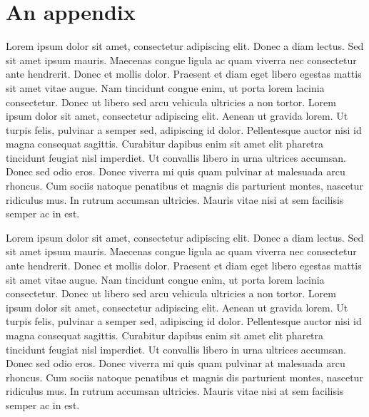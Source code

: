 \chapter{An appendix}
\label{ch:intro}

Lorem ipsum dolor sit amet, consectetur adipiscing elit. Donec a diam lectus.
Sed sit amet ipsum mauris. Maecenas congue ligula ac quam viverra nec
consectetur ante hendrerit. Donec et mollis dolor. Praesent et diam eget libero
egestas mattis sit amet vitae augue. Nam tincidunt congue enim, ut porta lorem
lacinia consectetur. Donec ut libero sed arcu vehicula ultricies a non tortor.
Lorem ipsum dolor sit amet, consectetur adipiscing elit. Aenean ut gravida
lorem. Ut turpis felis, pulvinar a semper sed, adipiscing id dolor. Pellentesque
auctor nisi id magna consequat sagittis. Curabitur dapibus enim sit amet elit
pharetra tincidunt feugiat nisl imperdiet. Ut convallis libero in urna ultrices
accumsan. Donec sed odio eros. Donec viverra mi quis quam pulvinar at malesuada
arcu rhoncus. Cum sociis natoque penatibus et magnis dis parturient montes,
nascetur ridiculus mus. In rutrum accumsan ultricies. Mauris vitae nisi at sem
facilisis semper ac in est.

Lorem ipsum dolor sit amet, consectetur adipiscing elit. Donec a diam lectus.
Sed sit amet ipsum mauris. Maecenas congue ligula ac quam viverra nec
consectetur ante hendrerit. Donec et mollis dolor. Praesent et diam eget libero
egestas mattis sit amet vitae augue. Nam tincidunt congue enim, ut porta lorem
lacinia consectetur. Donec ut libero sed arcu vehicula ultricies a non tortor.
Lorem ipsum dolor sit amet, consectetur adipiscing elit. Aenean ut gravida
lorem. Ut turpis felis, pulvinar a semper sed, adipiscing id dolor. Pellentesque
auctor nisi id magna consequat sagittis. Curabitur dapibus enim sit amet elit
pharetra tincidunt feugiat nisl imperdiet. Ut convallis libero in urna ultrices
accumsan. Donec sed odio eros. Donec viverra mi quis quam pulvinar at malesuada
arcu rhoncus. Cum sociis natoque penatibus et magnis dis parturient montes,
nascetur ridiculus mus. In rutrum accumsan ultricies. Mauris vitae nisi at sem
facilisis semper ac in est.
